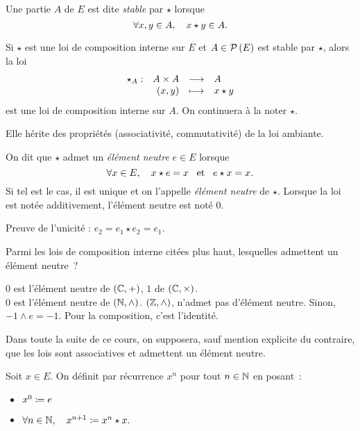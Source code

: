 \documentclass{magnolia}
\begin{document}
\begin{definition}
Une partie $A$ de $E$ est dite \emph{stable} par $\star$ lorsque
\[\forall x,y\in A ,\quad x\star y\in A.\]
\end{definition}

\begin{remarqueUnique}
\remarque Si $\star$ est une loi de composition interne sur $E$ et
  $A\in\mathcal{P}\left(E\right)$ est stable par $\star$, alors la loi
  \[\begin{array}[t]{lrcl} \displaystyle{\star_A} : & \displaystyle{A\times A} & \longrightarrow & \displaystyle{A} \\ & \displaystyle{\left(x,y\right)} & \longmapsto & \displaystyle{x\star y} \end{array}\]
  est une loi de composition interne sur $A$. On continuera à la noter
  $\star$.
\end{remarqueUnique}
\begin{sol}
Elle hérite des propriétés (associativité, commutativité) de la loi ambiante.
\end{sol}

\begin{definition}
On dit que $\star$ admet un \emph{élément neutre} $e\in E$ lorsque
\[\forall x\in E ,\quad x\star e=x \quad\!\text{et}\quad\! e \star x=x.\]
Si tel est le cas, il est unique et on l'appelle \emph{élément neutre} de $\star$.
Lorsque la loi est notée additivement, l'élément neutre est noté $0$.
\end{definition}

\begin{preuve}
Preuve de l'unicité : $e_2=e_1\star e_2=e_1$.
\end{preuve}

\begin{exoUnique}
\exo Parmi les lois de composition interne citées plus haut, lesquelles
  admettent un élément neutre~?
  \begin{sol}
  $0$ est l'élément neutre de $(\mathbb{C},+)$, $1$ de $(\mathbb{C},\times)$.\\
  $0$ est l'élément neutre de $(\mathbb{N},\wedge)$. $(\mathbb{Z},\wedge)$, n'admet pas d'élément neutre. Sinon, $-1\wedge e=-1$. Pour la composition, c'est l'identité.
  \end{sol}
\end{exoUnique}

\medskip
Dans toute la suite de ce cours, on supposera, sauf mention explicite
du contraire, que les lois sont associatives et admettent un élément neutre.
\medskip

\begin{definition}
Soit $x\in E$. On définit par récurrence $x^n$ pour tout $n\in\mathbb{N}$ en posant~:
\begin{itemize}
\item $x^0\coloneqq e$
\item $\forall n\in\mathbb{N} ,\quad x^{n+1}\coloneqq x^n\star x.$
\end{itemize}
\end{definition}
\end{document}
